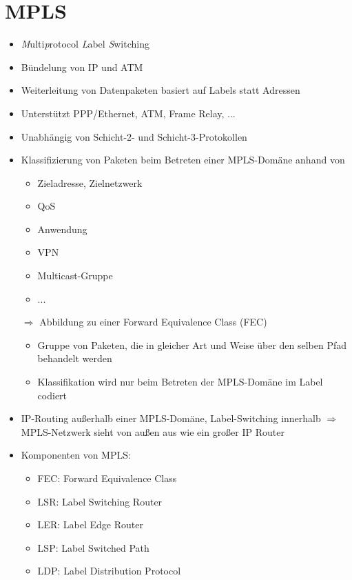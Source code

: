 \documentclass[a4paper,10pt]{scrartcl}
\begin{document}
\section{MPLS}
\begin{itemize}
\item   \emph{M}ulti\emph{p}rotocol \emph{L}abel \emph{S}witching
\item   Bündelung von IP und ATM
\item   Weiterleitung von Datenpaketen basiert auf Labels statt Adressen
\item   Unterstützt PPP/Ethernet, ATM, Frame Relay, ...
\item   Unabhängig von Schicht-2- und Schicht-3-Protokollen
\item   Klassifizierung von Paketen beim Betreten einer MPLS-Domäne anhand von
    \begin{itemize}
    \item   Zieladresse, Zielnetzwerk
    \item   QoS
    \item   Anwendung
    \item   VPN
    \item   Multicast-Gruppe
    \item   ...
    \end{itemize}
    $\Rightarrow$ Abbildung zu einer Forward Equivalence Class (FEC)
    \begin{itemize}
    \item   Gruppe von Paketen, die in gleicher Art und Weise über den selben Pfad behandelt werden
    \item   Klassifikation wird nur beim Betreten der MPLS-Domäne im Label codiert
    \end{itemize}
\item   IP-Routing außerhalb einer MPLS-Domäne, Label-Switching innerhalb
        $\Rightarrow$ MPLS-Netzwerk sieht von außen aus wie ein großer IP Router
\item   Komponenten von MPLS:
    \begin{itemize}
    \item   FEC: Forward Equivalence Class
    \item   LSR: Label Switching Router
    \item   LER: Label Edge Router
    \item   LSP: Label Switched Path
    \item   LDP: Label Distribution Protocol
    \end{itemize}
    \begin{center}

\end{center}
\end{itemize}
\end{document}
